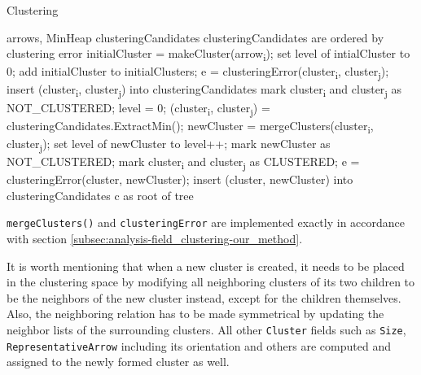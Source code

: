 \begin{algorithm}[H]
\caption{Clustering}
\label{algo:clustering}
\begin{algorithmic}[1]

\Require arrows, MinHeap clusteringCandidates \Comment clusteringCandidates are ordered by clustering error
\Statex
{}
	\State initialCluster = makeCluster(arrow\textsubscript{i});
    \State set level of intialCluster to 0;
    \State add initialCluster to initialClusters;
\EndFor
\Statex
{}
    	\State e = clusteringError(cluster\textsubscript{i}, cluster\textsubscript{j});
        \State insert (cluster\textsubscript{i}, cluster\textsubscript{j}) into clusteringCandidates
        \State mark cluster\textsubscript{i} and cluster\textsubscript{j} as NOT\_CLUSTERED;
    \EndFor
\EndFor
\Statex
\State level = 0;
	\State (cluster\textsubscript{i}, cluster\textsubscript{j}) = clusteringCandidates.ExtractMin();
    	\State newCluster = mergeClusters(cluster\textsubscript{i}, cluster\textsubscript{j});
        \State set level of newCluster to level++;
		\State mark newCluster as NOT\_CLUSTERED;
        \State mark cluster\textsubscript{i} and cluster\textsubscript{j} as CLUSTERED;
        	\State e = clusteringError(cluster, newCluster);
            \State insert (cluster, newCluster) into clusteringCandidates
        \EndFor
    \EndIf
\EndWhile
\Statex
\Return c as root of tree
\end{algorithmic}
\end{algorithm}

\verb+mergeClusters()+ and \verb+clusteringError+ are implemented exactly in accordance with section \ref{subsec:analysis-field_clustering-our_method}.

It is worth mentioning that when a new cluster is created, it needs to be placed in the clustering space by modifying all neighboring clusters of its two children to be the neighbors of the new cluster instead, except for the children themselves. Also, the neighboring relation has to be made symmetrical by updating the neighbor lists of the surrounding clusters. All other \verb+Cluster+ fields such as \verb+Size+, \verb+RepresentativeArrow+ including its orientation and others are computed and assigned to the newly formed cluster as well.

